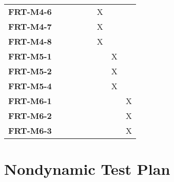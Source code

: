 \documentclass[12pt, titlepage]{article}
\begin{document}
\begin{longtable}{|l|cccccc|}
	\textbf{FRT-M4-6}  & ~                                        & ~           & ~           & X           & ~   & ~\\
	\textbf{FRT-M4-7}  & ~                                        & ~           & ~           & X           & ~   & ~\\
	\textbf{FRT-M4-8}  & ~                                        & ~           & ~           & X           & ~   & ~\\
	\textbf{FRT-M5-1}  & ~                                        & ~           & ~           & ~           & X  & ~ \\
	\textbf{FRT-M5-2}  & ~                                        & ~           & ~           & ~           & X  & ~ \\
	\textbf{FRT-M5-4}  & ~                                        & ~           & ~           & ~           & X  & ~ \\
	\textbf{FRT-M6-1}  & ~                                        & ~           & ~           & ~           & ~  & X \\
	\textbf{FRT-M6-2}  & ~                                        & ~           & ~           & ~           & ~  & X \\
	\textbf{FRT-M6-3}  & ~                                        & ~           & ~           & ~           & ~  & X \\
	\hline
\end{longtable}

\section{Nondynamic Test Plan}
\end{document}
